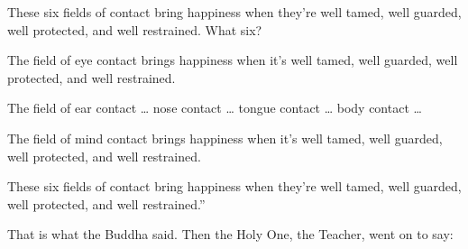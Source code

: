 \documentclass[12pt,openany]{book}%
\begin{document}
These six fields of contact bring happiness when they’re well tamed, well guarded, well protected, and well restrained. What six? 

The field of eye contact brings happiness when it’s well tamed, well guarded, well protected, and well restrained. 

The field of ear contact … nose contact … tongue contact … body contact … 

The field of mind contact brings happiness when it’s well tamed, well guarded, well protected, and well restrained. 

These six fields of contact bring happiness when they’re well tamed, well guarded, well protected, and well restrained.” 

That is what the Buddha said. Then the Holy One, the Teacher, went on to say: 
\end{document}
